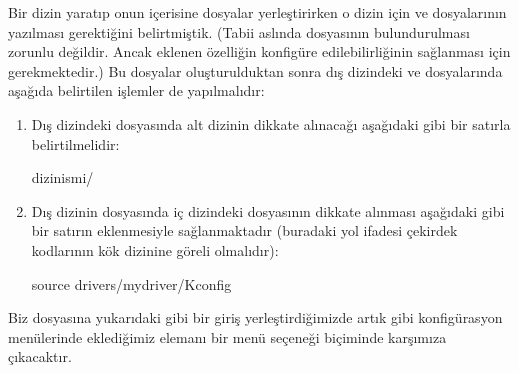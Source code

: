 \documentclass[a4paper,10pt,turkish]{sphinxmanual}
\begin{document}
\sphinxAtStartPar
Bir dizin yaratıp onun içerisine dosyalar yerleştirirken o dizin için  ve 
dosyalarının yazılması gerektiğini belirtmiştik. (Tabii aslında  dosyasının bulundurulması
zorunlu değildir. Ancak eklenen özelliğin konfigüre edilebilirliğinin sağlanması için gerekmektedir.)
Bu dosyalar oluşturulduktan sonra dış dizindeki  ve  dosyalarında aşağıda
belirtilen işlemler de yapılmalıdır:
\begin{enumerate}
%
\item {} 
\sphinxAtStartPar
Dış dizindeki  dosyasında alt dizinin dikkate alınacağı aşağıdaki gibi bir satırla
belirtilmelidir:

\begin{sphinxVerbatim}[commandchars=\\\{\}]
\PYGZlt{}dizin\PYGZus{}ismi\PYGZgt{}/
\end{sphinxVerbatim}

\item {} 
\sphinxAtStartPar
Dış dizinin  dosyasında iç dizindeki  dosyasının dikkate alınması aşağıdaki
gibi bir satırın eklenmesiyle sağlanmaktadır (buradaki yol ifadesi çekirdek kodlarının kök dizinine
göreli olmalıdır):

\begin{sphinxVerbatim}[commandchars=\\\{\}]
source \PYGZdq{}drivers/mydriver/Kconfig\PYGZdq{}
\end{sphinxVerbatim}

\end{enumerate}

\sphinxAtStartPar
Biz  dosyasına yukarıdaki gibi bir giriş yerleştirdiğimizde artık  gibi
konfigürasyon menülerinde eklediğimiz  elemanı bir menü seçeneği biçiminde karşımıza
çıkacaktır.
\end{document}
